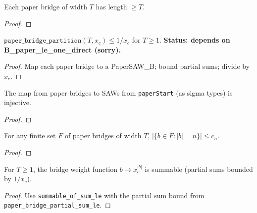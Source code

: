 \begin{lemma}\label{lem:paper_bridge_length}
\leanok
{}
  Each paper bridge of width $T$ has length $\geq T$.
\end{lemma}
\begin{proof}
\leanok
\end{proof}

\begin{theorem}\label{thm:paper_bridge_upper}
  $\texttt{paper\_bridge\_partition}(T, x_c) \leq 1/x_c$ for $T \geq 1$.
  \textbf{Status: depends on B\_paper\_le\_one\_direct (sorry).}
\end{theorem}
\begin{proof}
  Map each paper bridge to a PaperSAW\_B; bound partial sums;
  divide by $x_c$.
\end{proof}

\begin{lemma}\label{lem:paper_bridge_SAW}
\leanok
{}
  The map from paper bridges to SAWs from \texttt{paperStart}
  (as sigma types) is injective.
\end{lemma}
\begin{proof}
\leanok
\end{proof}

\begin{lemma}\label{lem:paper_bridge_filter}
\leanok
{}
  For any finite set $F$ of paper bridges of width $T$,
  $|\{b \in F : |b| = n\}| \leq c_n$.
\end{lemma}
\begin{proof}
\leanok
\end{proof}

\begin{lemma}\label{lem:paper_bridge_summable}
\leanok
{}
  For $T \geq 1$, the bridge weight function
  $b \mapsto x_c^{|b|}$ is summable (partial sums bounded by $1/x_c$).
\end{lemma}
\begin{proof}
\leanok
  Use \texttt{summable\_of\_sum\_le} with the partial sum bound from
  \texttt{paper\_bridge\_partial\_sum\_le}.
\end{proof}

